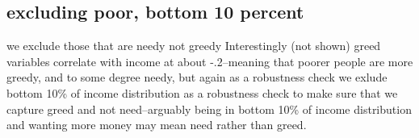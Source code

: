 \documentclass[10pt, letterpaper]{article}
\begin{document}
\begin{spacing}{1.8}
\section{excluding poor, bottom 10 percent}

we exclude those that are needy not greedy
Interestingly (not shown) greed variables correlate with income at about -.2--meaning that
poorer people are more greedy, and to some degree needy, but again as a
robustness check we exlude bottom 10\% of income distribution as a robustness
check to make sure that we capture greed and not need--arguably being in bottom
10\% of income distribution and wanting more money may mean need rather than greed. 






\end{spacing}
\end{document}
